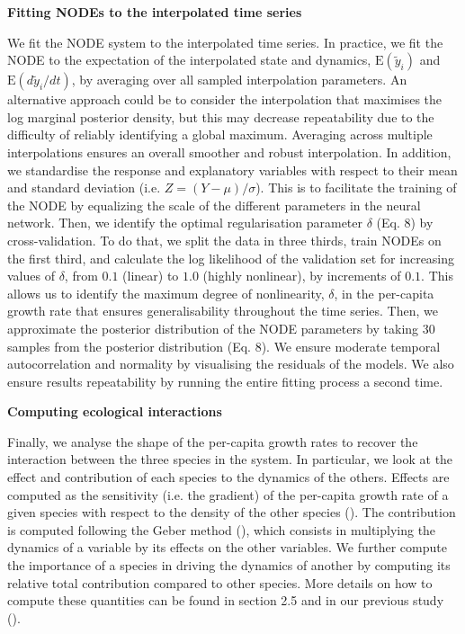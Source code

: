 \documentclass[11pt, oneside]{article}
\begin{document}
\textbf{Fitting NODEs to the interpolated time series}

We fit the NODE system to the interpolated time series.
In practice, we fit the NODE to the expectation of the interpolated state and dynamics, $\mathrm{E}(\tilde{y}_i)$ and $\mathrm{E}(d\tilde{y}_i/dt)$, by averaging over all sampled interpolation parameters.
An alternative approach could be to consider the interpolation that maximises the log marginal posterior density, but this may decrease repeatability due to the difficulty of reliably identifying a global maximum.
Averaging across multiple interpolations ensures an overall smoother and robust interpolation. 
In addition, we standardise the response and explanatory variables with respect to their mean and standard deviation (i.e. $Z=(Y-\mu)/\sigma$).
This is to facilitate the training of the NODE by equalizing the scale of the different parameters in the neural network.
Then, we identify the optimal regularisation parameter $\delta$ (Eq. 8) by cross-validation.
To do that, we split the data in three thirds, train NODEs on the first third, and calculate the log likelihood of the validation set for increasing values of $\delta$, from $0.1$ (linear) to $1.0$ (highly nonlinear), by increments of $0.1$.
This allows us to identify the maximum degree of nonlinearity, $\delta$, in the per-capita growth rate that ensures generalisability throughout the time series.
Then, we approximate the posterior distribution of the NODE parameters by taking 30 samples from the posterior distribution (Eq. 8).
We ensure moderate temporal autocorrelation and normality by visualising the residuals of the models.
We also ensure results repeatability by running the entire fitting process a second time.

\textbf{Computing ecological interactions}

Finally, we analyse the shape of the per-capita growth rates to recover the interaction between the three species in the system.
In particular, we look at the effect and contribution of each species to the dynamics of the others.
Effects are computed as the sensitivity (i.e. the gradient) of the per-capita growth rate of a given species with respect to the density of the other species (\cite{Sugihara2012,Bonnaffe2021a}).
The contribution is computed following the Geber method (\cite{Hairston2005}), which consists in multiplying the dynamics of a variable by its effects on the other variables.
We further compute the importance of a species in driving the dynamics of another by computing its relative total contribution compared to other species.
More details on how to compute these quantities can be found in section 2.5 and in our previous study (\cite{Bonnaffe2021a}).
\end{document}
